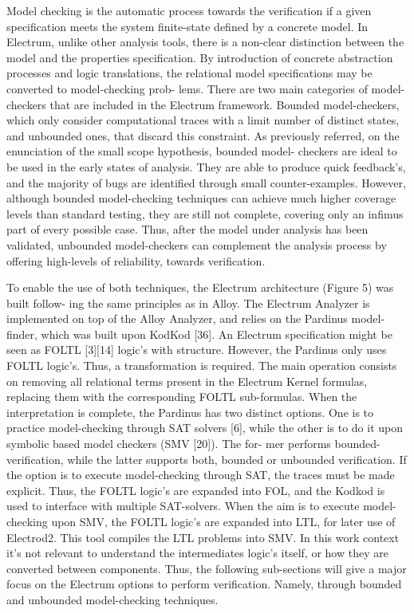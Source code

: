 Model checking is the automatic process towards the verification if a given specification meets the system finite-state defined by a concrete model. In Electrum, unlike other analysis tools, there is a non-clear distinction between the model and the properties specification. By introduction of concrete abstraction processes and logic translations, the relational model specifications may be converted to model-checking prob- lems. There are two main categories of model-checkers that are included in the Electrum framework. Bounded model-checkers, which only consider computational traces with a limit number of distinct states, and unbounded ones, that discard this constraint. As previously referred, on the enunciation of the small scope hypothesis, bounded model- checkers are ideal to be used in the early states of analysis. They are able to produce quick feedback’s, and the majority of bugs are identified through small counter-examples. However, although bounded model-checking techniques can achieve much higher coverage levels than standard testing, they are still not complete, covering only an infimus part of every possible case. Thus, after the model under analysis has been validated, unbounded model-checkers can complement the analysis process by offering high-levels of reliability, towards verification.

To enable the use of both techniques, the Electrum architecture (Figure 5) was built follow- ing the same principles as in Alloy. The Electrum Analyzer is implemented on top of the Alloy Analyzer, and relies on the Pardinus model-finder, which was built upon KodKod [36]. An Electrum specification might be seen as FOLTL [3][14] logic’s with structure. However, the Pardinus only uses FOLTL logic’s. Thus, a transformation is required. The main operation consists on removing all relational terms present in the Electrum Kernel formulas, replacing them with the corresponding FOLTL sub-formulas. When the interpretation is complete, the Pardinus has two distinct options. One is to practice model-checking through SAT solvers [6], while the other is to do it upon symbolic based model checkers (SMV [20]). The for- mer performs bounded-verification, while the latter supports both, bounded or unbounded verification. If the option is to execute model-checking through SAT, the traces must be made explicit. Thus, the FOLTL logic’s are expanded into FOL, and the Kodkod is used to interface with multiple SAT-solvers. When the aim is to execute model-checking upon SMV, the FOLTL logic’s are expanded into LTL, for later use of Electrod2. This tool compiles the LTL problems into SMV. In this work context it’s not relevant to understand the intermediates logic’s itself, or how they are converted between components. Thus, the following sub-sections will give a major focus on the Electrum options to perform verification. Namely, through bounded and unbounded model-checking techniques.